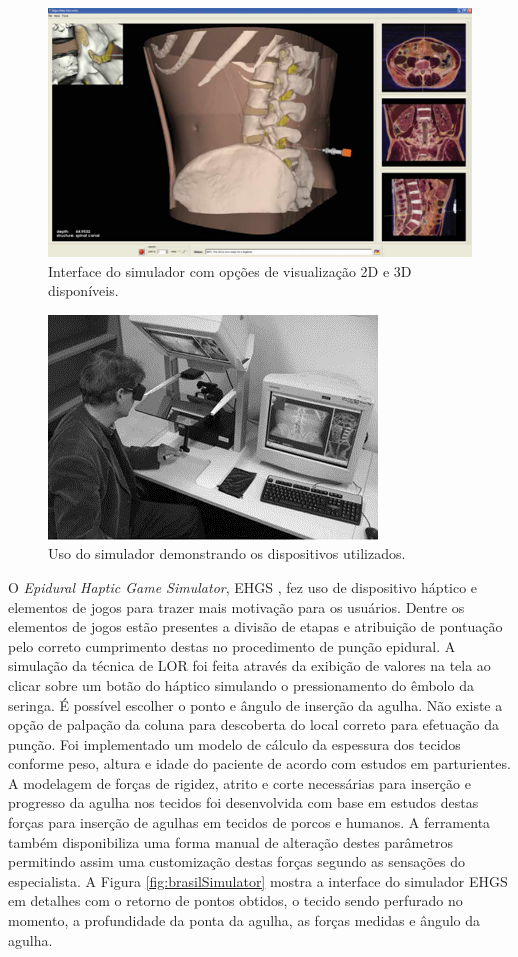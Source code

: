 \begin{figure}[ht!]
    \centering
    \includegraphics[width=0.8\linewidth]{capitulos/figuras/farberSimVisual.png} 
    \caption{Interface do simulador \cite{Farber2009} com opções de visualização 2D e 3D disponíveis.}
    \label{fig:farberSimVisual}
\end{figure}

\begin{figure}[ht!]
    \centering
    \includegraphics[width=0.5\linewidth]{capitulos/figuras/farberSimDispositivos.png} 
    \caption{Uso do simulador \cite{Farber2009} demonstrando os dispositivos utilizados.}
    \label{fig:farberSimDispositivos}
\end{figure}

O \textit{Epidural Haptic Game Simulator}, EHGS \cite{Brazil2017}, fez uso de dispositivo háptico e elementos de jogos para trazer mais motivação para os usuários. Dentre os elementos de jogos estão presentes a divisão de etapas e atribuição de pontuação pelo correto cumprimento destas no procedimento de punção epidural. A simulação da técnica de LOR foi feita através da exibição de valores na tela ao clicar sobre um botão do háptico simulando o pressionamento do êmbolo da seringa. É possível escolher o ponto e ângulo de inserção da agulha. Não existe a opção de palpação da coluna para descoberta do local correto para efetuação da punção. Foi implementado um modelo de cálculo da espessura dos tecidos conforme peso, altura e idade do paciente de acordo com estudos em parturientes. A modelagem de forças de rigidez, atrito e corte necessárias para inserção e progresso da agulha nos tecidos foi desenvolvida com base em estudos destas forças para inserção de agulhas em tecidos de porcos e humanos. A ferramenta também disponibiliza uma forma manual de alteração destes parâmetros permitindo assim uma customização destas forças segundo as sensações do especialista. A Figura \ref{fig:brasilSimulator} mostra a interface do simulador EHGS em detalhes com o retorno de pontos obtidos, o tecido sendo perfurado no momento, a profundidade da ponta da agulha, as forças medidas e ângulo da agulha.

